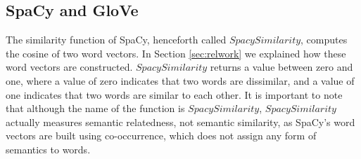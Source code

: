 \documentclass{article}
\begin{document}
\subsection{SpaCy and GloVe}
The similarity function of SpaCy, henceforth called $\textit{SpacySimilarity}$, computes the cosine of two word vectors. In Section \ref{sec:relwork} we explained how these word vectors are constructed. $\textit{SpacySimilarity}$ returns a value between zero and one, where a value of zero indicates that two words are dissimilar, and a value of one indicates that two words are similar to each other. It is important to note that although the name of the function is $\textit{SpacySimilarity}$, $\textit{SpacySimilarity}$ actually measures semantic relatedness, not semantic similarity, as SpaCy's word vectors are built using co-occurrence, which does not assign any form of semantics to words. 
\end{document}
